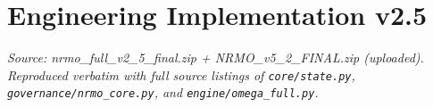 \part{Engineering Implementation v2.5}
\noindent\textit{Source: nrmo\_full\_v2\_5\_final.zip + NRMO\_v5\_2\_FINAL.zip
(uploaded). Reproduced verbatim with full source listings of
\texttt{core/state.py}, \texttt{governance/nrmo\_core.py}, and
\texttt{engine/omega\_full.py}.}




